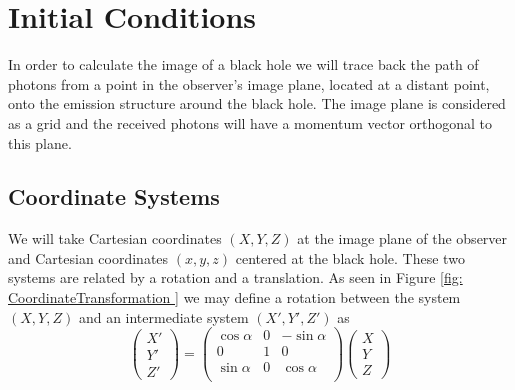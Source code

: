 
\chapter{Initial Conditions}

In order to calculate the image of a black hole we will trace back the path of photons from a point in the observer's image plane, located at a distant point, onto the emission structure around the black hole. The image plane is considered as a grid and the received photons will have a momentum vector orthogonal to this plane.\\

\section{Coordinate Systems}
We will take Cartesian coordinates $(X,Y,Z)$ at the image plane of the observer and Cartesian coordinates $(x,y,z)$ centered at the black hole. These two systems are related  by a rotation and a translation. As seen in Figure \ref{fig: CoordinateTransformation } we may define a rotation between the system $(X,Y,Z)$ and an intermediate system $(X',Y',Z')$ as
\begin{equation}
\begin{pmatrix}
X' \\
Y' \\
Z'
\end{pmatrix} =
\begin{pmatrix}
\cos \alpha & 0 &-\sin\alpha \\
0 & 1 &0\\
\sin \alpha &  0 & \cos \alpha\\
\end{pmatrix} 
\begin{pmatrix}
X\\
Y\\
Z
\end{pmatrix}
\end{equation}

